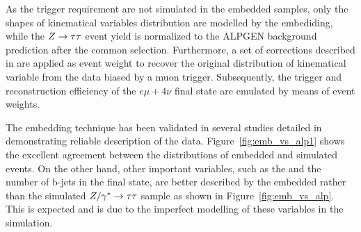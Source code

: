 

As the trigger requirement are  not simulated in the  embedded samples, only the shapes of kinematical variables 
distribution are modelled by the embediding, while the $Z\rightarrow \tau\tau$ event yield is normalized to the ALPGEN \Ztautau background prediction
after the common selection. Furthermore, a set of corrections  described in \cite{SMnew} are
applied as event weight to recover the original \Zmumu distribution of kinematical variable 
from the data biased by a muon trigger. Subsequently,
the trigger and reconstruction efficiency  of the $e \mu +4\nu $ final 
state are emulated by means of event weights.

The embedding technique has been validated in several studies detailed in~\cite{Embedding, SMnew}  demonstrating  reliable 
description of the data. Figure~\ref{fig:emb_vs_alp1} shows the excellent agreement between  the \mmc distributions of embedded and 
simulated \Ztautau events. On the other hand, other important variables, such as the \MET
and the number of b-jets in the final state, are  better described by the embedded rather than the 
simulated $Z/\gamma^*\rightarrow \tau\tau$ sample as shown in Figure~\ref{fig:emb_vs_alp}.
This  is expected and is due to the imperfect modelling of these variables in the simulation.


